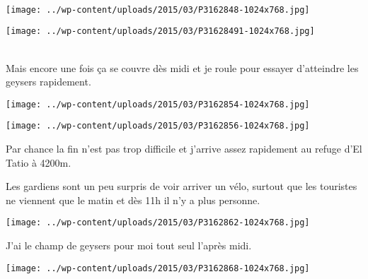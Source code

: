 \pagebreak
~\\
\begin{center} \texttt{[image: ../wp-content/uploads/2015/03/P3162848-1024x768.jpg]} \end{center}
\begin{center} \texttt{[image: ../wp-content/uploads/2015/03/P31628491-1024x768.jpg]} \end{center}

~\\

\pagebreak
Mais encore une fois ça se couvre dès midi et je roule pour essayer d'atteindre les geysers rapidement. 
\begin{center} \texttt{[image: ../wp-content/uploads/2015/03/P3162854-1024x768.jpg]} \end{center}
\begin{center} \texttt{[image: ../wp-content/uploads/2015/03/P3162856-1024x768.jpg]} \end{center}

 Par chance la fin n'est pas trop difficile et j'arrive assez rapidement au refuge d'El Tatio à 4200m. 

\pagebreak
 Les gardiens sont un peu surpris de voir arriver un vélo, surtout que les touristes ne viennent que le matin et dès 11h il n'y a plus personne. 
\begin{center} \texttt{[image: ../wp-content/uploads/2015/03/P3162862-1024x768.jpg]} \end{center}

 J'ai le champ de geysers pour moi tout seul l'après midi. 
\begin{center} \texttt{[image: ../wp-content/uploads/2015/03/P3162868-1024x768.jpg]} \end{center}
\vspace{-\topsep}

